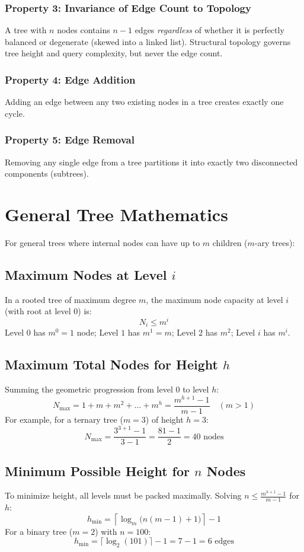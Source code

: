 \subsubsection{Property 3: Invariance of Edge Count to Topology}
A tree with $n$ nodes contains $n - 1$ edges \emph{regardless} of whether it is perfectly balanced or degenerate (skewed into a linked list). Structural topology governs tree height and query complexity, but never the edge count.

\subsubsection{Property 4: Edge Addition}
Adding an edge between any two existing nodes in a tree creates exactly one cycle.

\subsubsection{Property 5: Edge Removal}
Removing any single edge from a tree partitions it into exactly two disconnected components (subtrees).

\section{General Tree Mathematics}

For general trees where internal nodes can have up to $m$ children ($m$-ary trees):

\subsection{Maximum Nodes at Level $i$}
In a rooted tree of maximum degree $m$, the maximum node capacity at level $i$ (with root at level $0$) is:
\[
\boxed{N_i \leq m^i}
\]
Level $0$ has $m^0 = 1$ node; Level $1$ has $m^1 = m$; Level $2$ has $m^2$; Level $i$ has $m^i$.

\subsection{Maximum Total Nodes for Height $h$}
Summing the geometric progression from level $0$ to level $h$:
\[
N_{\max} = 1 + m + m^2 + \dots + m^h = \boxed{\frac{m^{h+1} - 1}{m - 1}} \quad (m > 1)
\]
For example, for a ternary tree ($m = 3$) of height $h = 3$:
\[
N_{\max} = \frac{3^{3+1} - 1}{3 - 1} = \frac{81 - 1}{2} = 40 \text{ nodes}
\]

\subsection{Minimum Possible Height for $n$ Nodes}
To minimize height, all levels must be packed maximally. Solving $n \leq \frac{m^{h+1}-1}{m-1}$ for $h$:
\[
\boxed{h_{\min} = \left\lceil \log_m\big(n(m - 1) + 1\big) \right\rceil - 1}
\]
For a binary tree ($m = 2$) with $n = 100$:
\[
h_{\min} = \lceil \log_2(101) \rceil - 1 = 7 - 1 = 6 \text{ edges}
\]

